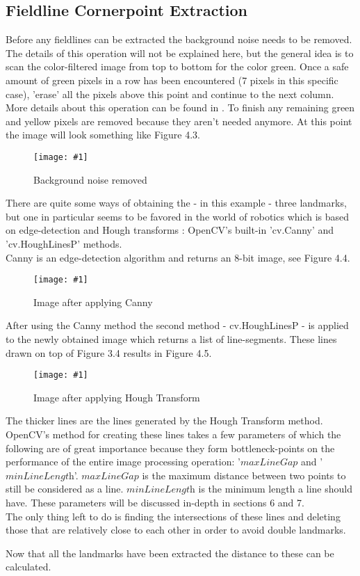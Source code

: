 \documentclass{ba-kecs}
\numberwithin{figure}{section}
\numberwithin{equation}{section}
\newcommand{\dkepic}[2]{ %
	\begin{figure}[H] %
	\texttt{[image: \#1]}
	\caption{#2}
	\label{#1}
	\end{figure}
}
\begin{document}
\subsection{Fieldline Cornerpoint Extraction} 
Before any fieldlines can be extracted the background noise needs to be removed. The details of this operation will not be explained here, but the general idea is to scan the color-filtered image from top to bottom for the color green. Once a safe amount of green pixels in a row has been encountered (7 pixels in this specific case), 'erase' all the pixels above this point and continue to the next column. More details about this operation can be found in \cite{ref1}. To finish any remaining green and yellow pixels are removed because they aren't needed anymore. At this point the image will look something like Figure 4.3.\\
\dkepic{figure_IP3}{Background noise removed}
There are quite some ways of obtaining the - in this example - three landmarks, but one in particular seems to be favored in the world of robotics which is based on edge-detection and Hough transforms \cite{ref2}\cite{ref3}: OpenCV's built-in 'cv.Canny' and 'cv.HoughLinesP' methods. \\
Canny is an edge-detection algorithm and returns an 8-bit image, see Figure 4.4.\\
\dkepic{figure_IP4}{Image after applying Canny}
After using the Canny method the second method - cv.HoughLinesP - is applied to the newly obtained image which returns a list of line-segments. These lines drawn on top of Figure 3.4 results in Figure 4.5.\\
\dkepic{figure_IP5}{Image after applying Hough Transform}
The thicker lines are the lines generated by the Hough Transform method.
OpenCV's method for creating these lines takes a few parameters of which the following are of great importance because they form bottleneck-points on the performance of the entire image processing operation: '$\textit{maxLineGap}$ and '$\textit{minLineLength}$'. $\textit{maxLineGap}$ is the maximum distance between two points to still be considered as a line. $\textit{minLineLength}$ is the minimum length a line should have. These parameters will be discussed in-depth in sections 6 and 7. \\
The only thing left to do is finding the intersections of these lines and deleting those that are relatively close to each other in order to avoid double landmarks.


Now that all the landmarks have been extracted the distance to these can be calculated. 
\end{document}
